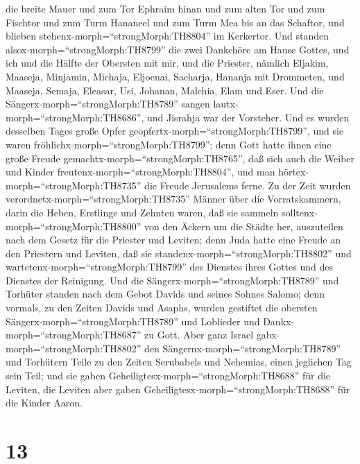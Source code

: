 die breite Mauer  und zum Tor Ephraim hinan und zum alten
Tor und zum Fischtor und zum Turm Hananeel und zum Turm Mea bis an das
Schaftor, und blieben stehenx-morph=``strongMorph:TH8804'' im Kerkertor.
 Und standen alsox-morph=``strongMorph:TH8799'' die zwei
Dankchöre am Hause Gottes, und ich und die Hälfte der Obersten mit mir,
 und die Priester, nämlich Eljakim, Maaseja, Minjamin,
Michaja, Eljoenai, Sacharja, Hananja mit Drommeten,  und
Maaseja, Semaja, Eleasar, Usi, Johanan, Malchia, Elam und Eser. Und die
Sängerx-morph=``strongMorph:TH8789'' sangen
lautx-morph=``strongMorph:TH8686'', und Jisrahja war der Vorsteher.
 Und es wurden desselben Tages große Opfer
geopfertx-morph=``strongMorph:TH8799'', und sie waren
fröhlichx-morph=``strongMorph:TH8799''; denn Gott hatte ihnen eine große
Freude gemachtx-morph=``strongMorph:TH8765'', daß sich auch die Weiber
und Kinder freutenx-morph=``strongMorph:TH8804'', und man
hörtex-morph=``strongMorph:TH8735'' die Freude Jerusalems ferne.
 Zu der Zeit wurden verordnetx-morph=``strongMorph:TH8735''
Männer über die Vorratskammern, darin die Heben, Erstlinge und Zehnten
waren, daß sie sammeln solltenx-morph=``strongMorph:TH8800'' von den
Äckern um die Städte her, auszuteilen nach dem Gesetz für die Priester
und Leviten; denn Juda hatte eine Freude an den Priestern und Leviten,
daß sie standenx-morph=``strongMorph:TH8802''  und
wartetenx-morph=``strongMorph:TH8799'' des Dienstes ihres Gottes und des
Dienstes der Reinigung. Und die Sängerx-morph=``strongMorph:TH8789'' und
Torhüter standen nach dem Gebot Davids und seines Sohnes Salomo;
 denn vormals, zu den Zeiten Davids und Asaphs, wurden
gestiftet die obersten Sängerx-morph=``strongMorph:TH8789'' und
Loblieder und Dankx-morph=``strongMorph:TH8687'' zu Gott. 
Aber ganz Israel gabx-morph=``strongMorph:TH8802'' den
Sängernx-morph=``strongMorph:TH8789'' und Torhütern Teile zu den Zeiten
Serubabels und Nehemias, einen jeglichen Tag sein Teil; und sie gaben
Geheiligtesx-morph=``strongMorph:TH8688'' für die Leviten, die Leviten
aber gaben Geheiligtesx-morph=``strongMorph:TH8688'' für die Kinder
Aaron.

\hypertarget{section-12}{%
\section{13}\label{section-12}}

